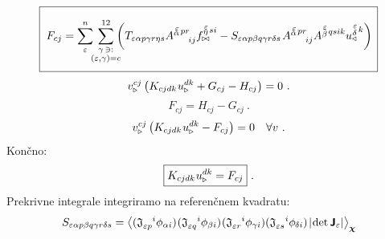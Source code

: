 \vspace{1mm}
\begin{equation}
   \boxed{ \phantom{\rule[-9mm]{1mm}{18mm}}
   F_{c j} =
   \sum^n_\varepsilon
   \mkern-7mu
   \sum_{\substack{\gamma \, \ni: \\
      (\varepsilon,\gamma) = c}}^{12}
   \mkern-10mu
   \qty(
   T_{\varepsilon   \alpha p   \gamma r   \eta s}
   A^{\substack{\mkern2mu \varepsilon \\[-0.65mm] \alpha} \mkern2mu p r}_{\mkern29mu i j}
   f^{\substack{\mkern2mu \varepsilon \\[-0.59mm] \eta} \mkern2mu s i}_{\bowtie}
   -
   S_{\varepsilon   \alpha p   \beta q   \gamma r   \delta s} \mkern2mu
   A^{\substack{\mkern2mu \varepsilon \\[-0.65mm] \alpha} \mkern2mu p r}_{\mkern29mu i j}
   A^{\substack{\mkern2mu \varepsilon \\[0.05mm] \beta} \mkern2mu q s i k}
   u^{\substack{\mkern2mu \varepsilon \\[0.09mm] \delta} \mkern2mu k}_\triangleleft ) \mkern3mu }
\end{equation}
\begin{equation*}
   v^{c j}_{\triangleright} \left(
   K_{c j d k} \mkern1mu u^{d k}_\triangleright
   +
   G_{c j}
   -
   H_{c j}
   \right) = 0 \ .
\end{equation*}
\begin{equation*}
   F_{c j} = H_{c j} - G_{c j} \ .
\end{equation*}
\begin{equation*}
   v^{c j}_{\triangleright} \left(
   K_{c j d k} \mkern1mu u^{d k}_\triangleright
   -
   F_{c j}
   \right) = 0 \quad \forall v \ .
\end{equation*}
Končno:
\begin{equation}
   \boxed{
   K_{c j d k} \mkern1mu u^{d k}_\triangleright
   =
   F_{c j} } \ .
\end{equation}
Prekrivne integrale integriramo na referenčnem kvadratu:
\begin{equation}
   S_{\varepsilon  \alpha p \beta q \gamma r \delta s}
   =
   \expval{
      ( \mathfrak{J}_{\varepsilon p}^{\mkern18mu i} \phi_{\alpha i}) \mkern1mu
      ( \mathfrak{J}_{\varepsilon q}^{\mkern18mu i} \phi_{\beta i} ) \mkern1mu
      ( \mathfrak{J}_{\varepsilon r}^{\mkern18mu i} \phi_{\gamma i})
      ( \mathfrak{J}_{\varepsilon s}^{\mkern18mu i} \phi_{\mkern-1mu \delta i} ) \mkern2mu
      |\mkern-2mu \det \bm{\mathsf{J}}_\varepsilon | }_{\bm{\chi}}
\end{equation}
